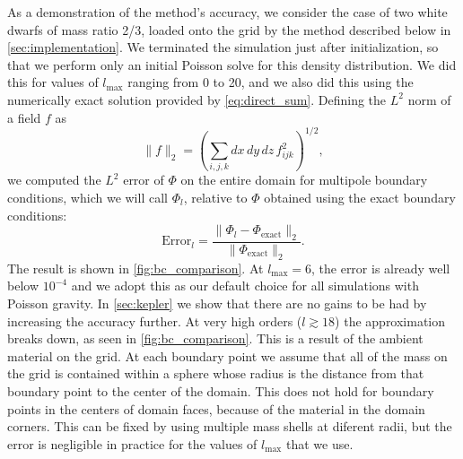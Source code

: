 \documentclass[iop]{../emulateapj}
\begin{document}
As a demonstration of the method's accuracy, we consider the case of two 
white dwarfs of mass ratio 2/3, loaded onto the grid by the method described below 
in \autoref{sec:implementation}. We terminated the simulation just after
initialization, so that we perform only an initial Poisson solve for this 
density distribution. We did this for values of $l_{\text{max}}$ ranging
from 0 to 20, and we also did this using the numerically exact solution 
provided by \autoref{eq:direct_sum}.  Defining the $L^2$
norm of a field $f$ as
\begin{equation}
  \| f \|_2 = \left(\sum_{i,j,k} dx\, dy\, dz\, f_{ijk}^2\right)^{1/2},
\end{equation}
we computed the $L^2$ error of $\Phi$ on the entire domain for multipole 
boundary conditions, which we will call $\Phi_l$, relative to $\Phi$ 
obtained using the exact boundary conditions:
\begin{equation}
  \text{Error}_l = \frac{\|\Phi_l - \Phi_{\text{exact}}\|_2}{\|\Phi_{\text{exact}}\|_2}.
\end{equation}
The result is shown in \autoref{fig:bc_comparison}. At $l_{\text{max}} = 6$,
the error is already well below $10^{-4}$ and we adopt this as our default 
choice for all simulations with Poisson gravity. In \autoref{sec:kepler} we 
show that there are no gains to be had by increasing the accuracy further. At 
very high orders ($l \gtrsim 18$) the approximation breaks down, as seen in \autoref{fig:bc_comparison}. 
This is a result of the ambient material on the grid. At each boundary point we 
assume that all of the mass on the grid is contained within a sphere whose radius is 
the distance from that boundary point to the center of the domain. This does not hold 
for boundary points in the centers of domain faces, because of the material in the 
domain corners. This can be fixed by using multiple mass shells at diferent radii, but the error 
is negligible in practice for the values of $l_{\text{max}}$ that we use.
\end{document}

